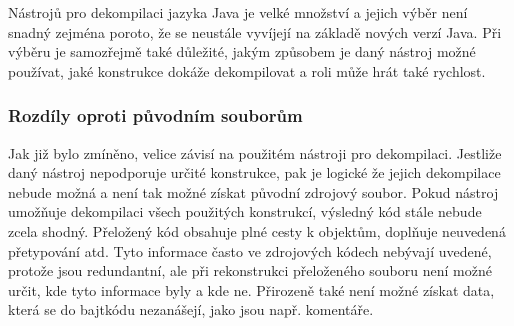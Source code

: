 				Nástrojů pro dekompilaci jazyka Java je velké množství a jejich výběr není snadný zejména poroto, že se neustále vyvíjejí na základě nových verzí Java. Při výběru je samozřejmě také důležité, jakým způsobem je daný nástroj možné používat, jaké konstrukce dokáže dekompilovat a roli může hrát také rychlost.
				
			\subsubsection{Rozdíly oproti původním souborům}
				Jak již bylo zmíněno, velice závisí na použitém nástroji pro dekompilaci. Jestliže daný nástroj nepodporuje určité konstrukce, pak je logické že jejich dekompilace nebude možná a není tak možné získat původní zdrojový soubor. Pokud nástroj umožňuje dekompilaci všech použitých konstrukcí, výsledný kód stále nebude zcela shodný. Přeložený kód obsahuje plné cesty k objektům, doplňuje neuvedená přetypování atd. Tyto informace často ve zdrojových kódech nebývají uvedené, protože jsou redundantní, ale při rekonstrukci přeloženého souboru není možné určit, kde tyto informace byly a kde ne. Přirozeně také není možné získat data, která se do bajtkódu nezanášejí, jako jsou např. komentáře.